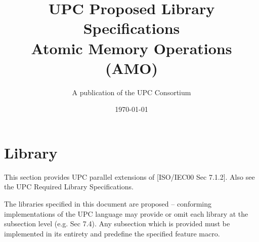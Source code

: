\newcommand{\myspecversion}{Version 1.3}
\newcommand{\mydraftversion}{Draft 1.1}
\newcommand{\myversion}{\specversion}
\newcommand{\mytitle}{UPC Proposed Library Specifications\\
                      Atomic Memory Operations (AMO)}


\makeindex

\title{\mytitle\\
\myversion}

\author{A publication of the UPC Consortium}

\date{\today}



\maketitle

\setcounter{page}{2}
\dotoc

\setcounter{section}{6} %
\section{Library}

\npf This section provides UPC parallel extensions of [ISO/IEC00 Sec 7.1.2]. Also see the UPC Required Library Specifications.

\np The libraries specified in this document are proposed --
conforming implementations of the UPC language may provide or 
omit each library at the subsection level (e.g. Sec 7.4). 
Any subsection which is provided must be implemented in its
entirety and predefine the specified feature macro.

\setcounter{subsection}{3} %


\doindex

